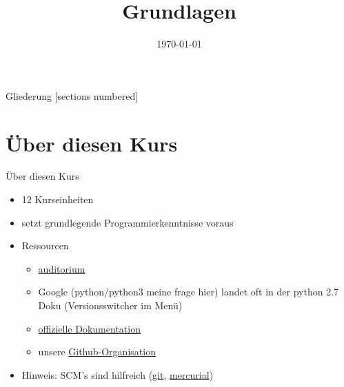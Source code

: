 



\title{Grundlagen}
\date{\today}




\maketitle

\begin{frame}{Gliederung}
	[sections numbered]
	\tableofcontents
\end{frame}

\section{Über diesen Kurs}
\begin{frame}{Über diesen Kurs}
	\begin{itemize}
    	\item 12 Kurseinheiten
    	\item setzt grundlegende Programmierkenntnisse voraus
    	\item Ressourcen
    	\begin{itemize}
    	    \item \href{http://auditorium.inf.tu-dresden.de}{auditorium} %
	        \item Google (python/python3 meine frage hier) landet oft in der python 2.7 Doku (Versionsswitcher im Menü)
    	    \item \href{docs.python.org}{offizielle Dokumentation}
    	    \item unsere \href{https://github.com/fsr}{Github-Organisation}
    	\end{itemize}
    	\item Hinweis: SCM's sind hilfreich (\href{https://git-scm.com}{git}, \href{http://mercurial.selenic.com/}{mercurial})
	\end{itemize}
\end{frame}


